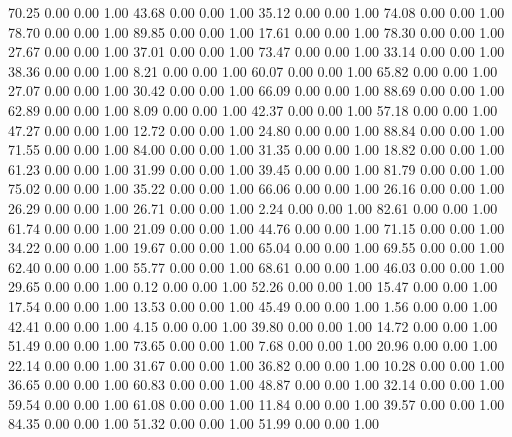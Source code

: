    70.25   0.00   0.00   1.00
   43.68   0.00   0.00   1.00
   35.12   0.00   0.00   1.00
   74.08   0.00   0.00   1.00
   78.70   0.00   0.00   1.00
   89.85   0.00   0.00   1.00
   17.61   0.00   0.00   1.00
   78.30   0.00   0.00   1.00
   27.67   0.00   0.00   1.00
   37.01   0.00   0.00   1.00
   73.47   0.00   0.00   1.00
   33.14   0.00   0.00   1.00
   38.36   0.00   0.00   1.00
    8.21   0.00   0.00   1.00
   60.07   0.00   0.00   1.00
   65.82   0.00   0.00   1.00
   27.07   0.00   0.00   1.00
   30.42   0.00   0.00   1.00
   66.09   0.00   0.00   1.00
   88.69   0.00   0.00   1.00
   62.89   0.00   0.00   1.00
    8.09   0.00   0.00   1.00
   42.37   0.00   0.00   1.00
   57.18   0.00   0.00   1.00
   47.27   0.00   0.00   1.00
   12.72   0.00   0.00   1.00
   24.80   0.00   0.00   1.00
   88.84   0.00   0.00   1.00
   71.55   0.00   0.00   1.00
   84.00   0.00   0.00   1.00
   31.35   0.00   0.00   1.00
   18.82   0.00   0.00   1.00
   61.23   0.00   0.00   1.00
   31.99   0.00   0.00   1.00
   39.45   0.00   0.00   1.00
   81.79   0.00   0.00   1.00
   75.02   0.00   0.00   1.00
   35.22   0.00   0.00   1.00
   66.06   0.00   0.00   1.00
   26.16   0.00   0.00   1.00
   26.29   0.00   0.00   1.00
   26.71   0.00   0.00   1.00
    2.24   0.00   0.00   1.00
   82.61   0.00   0.00   1.00
   61.74   0.00   0.00   1.00
   21.09   0.00   0.00   1.00
   44.76   0.00   0.00   1.00
   71.15   0.00   0.00   1.00
   34.22   0.00   0.00   1.00
   19.67   0.00   0.00   1.00
   65.04   0.00   0.00   1.00
   69.55   0.00   0.00   1.00
   62.40   0.00   0.00   1.00
   55.77   0.00   0.00   1.00
   68.61   0.00   0.00   1.00
   46.03   0.00   0.00   1.00
   29.65   0.00   0.00   1.00
    0.12   0.00   0.00   1.00
   52.26   0.00   0.00   1.00
   15.47   0.00   0.00   1.00
   17.54   0.00   0.00   1.00
   13.53   0.00   0.00   1.00
   45.49   0.00   0.00   1.00
    1.56   0.00   0.00   1.00
   42.41   0.00   0.00   1.00
    4.15   0.00   0.00   1.00
   39.80   0.00   0.00   1.00
   14.72   0.00   0.00   1.00
   51.49   0.00   0.00   1.00
   73.65   0.00   0.00   1.00
    7.68   0.00   0.00   1.00
   20.96   0.00   0.00   1.00
   22.14   0.00   0.00   1.00
   31.67   0.00   0.00   1.00
   36.82   0.00   0.00   1.00
   10.28   0.00   0.00   1.00
   36.65   0.00   0.00   1.00
   60.83   0.00   0.00   1.00
   48.87   0.00   0.00   1.00
   32.14   0.00   0.00   1.00
   59.54   0.00   0.00   1.00
   61.08   0.00   0.00   1.00
   11.84   0.00   0.00   1.00
   39.57   0.00   0.00   1.00
   84.35   0.00   0.00   1.00
   51.32   0.00   0.00   1.00
   51.99   0.00   0.00   1.00
